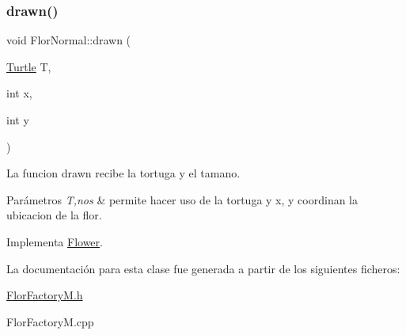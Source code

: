 \mbox{\label{classFlorNormal_a615fc2015eeeaccd06d125d28efbd91c}} 
\subsubsection{\texorpdfstring{drawn()}{drawn()}}
{\footnotesize\ttfamily void Flor\+Normal\+::drawn (\begin{DoxyParamCaption}\item[{\hyperlink{classTurtle}{Turtle}}]{T,  }\item[{int}]{x,  }\item[{int}]{y }\end{DoxyParamCaption})\hspace{0.3cm}{\ttfamily [virtual]}}

La funcion drawn recibe la tortuga y el tamano. 
\begin{DoxyParams}{Parámetros}
{\em T,nos} & permite hacer uso de la tortuga y x, y coordinan la ubicacion de la flor. \\
\hline
\end{DoxyParams}


Implementa \hyperlink{classFlower_af01eea570f9d02e16cda1d86ee97633c}{Flower}.



La documentación para esta clase fue generada a partir de los siguientes ficheros\+:\begin{DoxyCompactItemize}
\item 
\hyperlink{FlorFactoryM_8h}{Flor\+Factory\+M.\+h}\item 
Flor\+Factory\+M.\+cpp\end{DoxyCompactItemize}
